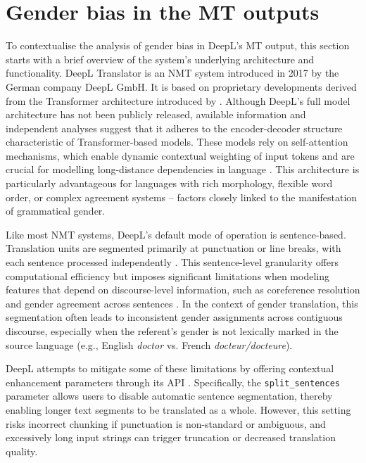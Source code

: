\section{Gender bias in the MT outputs}
To contextualise the analysis of gender bias in DeepL's MT output, this section starts with a brief overview of the system's underlying architecture and functionality. DeepL Translator is an NMT system introduced in 2017 by the German company DeepL GmbH. It is based on proprietary developments derived from the Transformer architecture introduced by \textcite{vaswani2017attention}. Although DeepL's full model architecture has not been publicly released, available information and independent analyses suggest that it adheres to the encoder-decoder structure characteristic of Transformer-based models. These models rely on self-attention mechanisms, which enable dynamic contextual weighting of input tokens and are crucial for modelling long-distance dependencies in language \citep{bahdanau2015neural,vaswani2017attention,popel2020transforming}. This architecture is particularly advantageous for languages with rich morphology, flexible word order, or complex agreement systems -- factors closely linked to the manifestation of grammatical gender.

Like most NMT systems, DeepL’s default mode of operation is sentence-based. Translation units are segmented primarily at punctuation or line breaks, with each sentence processed independently \citep{laubli-etal-2018-machine,deepl_api_reference}. This sentence-level granularity offers computational efficiency but imposes significant limitations when modeling features that depend on discourse-level information, such as coreference resolution and gender agreement across sentences \citep{hardmeier2014discourse,voita2018context}. In the context of gender translation, this segmentation often leads to inconsistent gender assignments across contiguous discourse, especially when the referent’s gender is not lexically marked in the source language (e.g., English \textit{doctor} vs. French \textit{docteur/docteure}).

DeepL attempts to mitigate some of these limitations by offering contextual enhancement parameters through its API \citep{deepl_api_reference}. Specifically, the \texttt{split\_sentences} parameter allows users to disable automatic sentence segmentation, thereby enabling longer text segments to be translated as a whole. However, this setting risks incorrect chunking if punctuation is non-standard or ambiguous, and excessively long input strings can trigger truncation or decreased translation quality.

